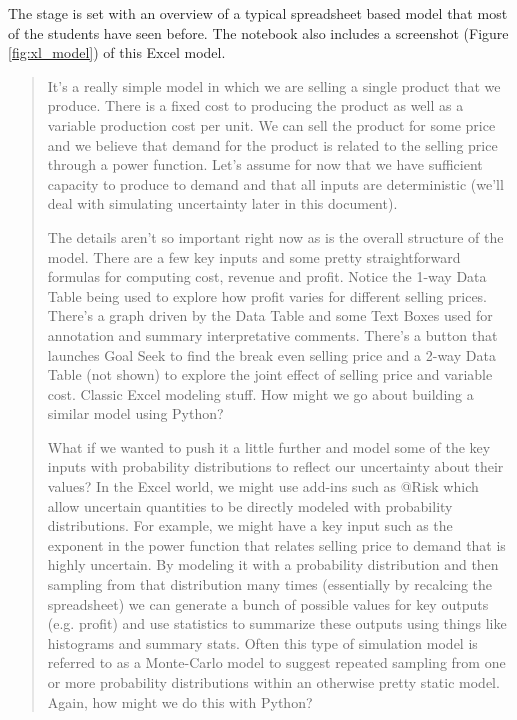 \documentclass[ited]{informs3}                      %
\begin{document}
The stage is set with an overview of a typical spreadsheet based model that most of the students have seen before. The notebook also includes a screenshot (Figure \ref{fig:xl_model}) of this Excel model. 

\begin{tcolorbox}[boxrule=1pt,sharp corners]
\begin{quotation}
\textsf{	
	It's a really simple model in which we are selling a single product that we produce. There is a fixed cost to producing the product as well as a variable production cost per unit. We can sell the product for some price and we believe that demand for the product is related to the selling price through a power function. Let's assume for now that we have sufficient capacity to produce to demand and that all inputs are deterministic (we'll deal with simulating uncertainty later in this document).}
	
	\textsf{The details aren't so important right now as is the overall structure of the model. There are a few key inputs and some pretty straightforward formulas for computing cost, revenue and profit. Notice the 1-way Data Table being used to explore how profit varies for different selling prices. There's a graph driven by the Data Table and some Text Boxes used for annotation and summary interpretative comments. There's a button that launches Goal Seek to find the break even selling price and a 2-way Data Table (not shown) to explore the joint effect of selling price and variable cost. Classic Excel modeling stuff. How might we go about building a similar model using Python? } 
	
	\textsf{What if we wanted to push it a little further and model some of the key inputs with probability distributions to reflect our uncertainty about their values? In the Excel world, we might use add-ins such as @Risk which allow uncertain quantities to be directly modeled with probability distributions. For example, we might have a key input such as the exponent in the power function that relates selling price to demand that is highly uncertain. By modeling it with a probability distribution and then sampling from that distribution many times (essentially by recalcing the spreadsheet) we can generate a bunch of possible values for key outputs (e.g. profit) and use statistics to summarize these outputs using things like histograms and summary stats. Often this type of simulation model is referred to as a Monte-Carlo model to suggest repeated sampling from one or more probability distributions within an otherwise pretty static model. Again, how might we do this with Python?}
\end{quotation}
\end{tcolorbox}
\end{document}

